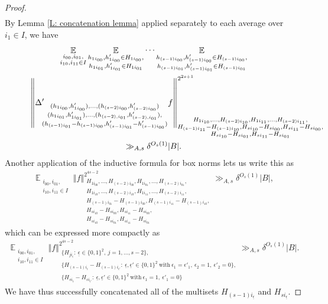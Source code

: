 \documentclass[11pt]{amsart}
\theoremstyle{definition}
\DeclareMathOperator*{\E}{\mathbb{E}}
\newcommand{\ueps}{{\underline{\epsilon}}}
\newcommand{\norm}[1]{\left\Vert #1\right\Vert}
\begin{document}
\begin{proof}
\begin{multline*}
\end{multline*}
By Lemma \ref{L: concatenation lemma} applied separately to each average over $i_1\in I$, we have
\begin{multline*}
    \E_{\substack{i_{00}, i_{01},\\ i_{10}, i_{11}\in I}} 
    \E_{\substack{h_{1i_{00}}, h_{1i_{00}}'\in H_{1i_{00}},\\ h_{1i_{01}}, h_{1i_{01}}'\in H_{1i_{01}}}}\cdots 
    \E_{\substack{h_{(s-1) i_{00}}, h_{(s-1) i_{00}}'\in H_{(s-1) i_{00}},\\ h_{(s-1) i_{01}}, h_{(s-1) i_{01}}'\in H_{(s-1) i_{01}}}}\\
    \norm{\Delta'_{\substack{(h_{1 i_{00}}, h_{1 i_{00}}'), \ldots, (h_{(s-2) i_{00}}, h_{(s-2) i_{00}}')\\ (h_{1 i_{01}}, h_{1 i_{01}}'), \ldots, (h_{(s-2), i_{01}}, h_{(s-2), i_{01}}'),\\ (h_{(s-1) i_{01}} - h_{(s-1) i_{00}}, h'_{(s-1) i_{01}} - h'_{(s-1) i_{00}}) }} f}_{\substack{H_{1 i_{10}}, \ldots, H_{(s-2) i_{10}}, H_{1 i_{11}}, \ldots, H_{(s-2) i_{11}},\\ H_{(s-1) i_{11}}-H_{(s-1) i_{10}}, H_{s i_{10}}-H_{s i_{00}}, H_{s i_{11}}-H_{s i_{00}},\\ H_{s i_{10}}-H_{s i_{01}}, H_{s i_{11}}-H_{s i_{01}}}}^{2^{2s+1}} \hspace{-20mm}\\ \gg_{A, s} \delta^{O_s(1)}|B|.
\end{multline*}
Another application of the inductive formula for box norms lets us write this as
\begin{align*}
    \E_{\substack{i_{00}, i_{01},\\ i_{10}, i_{11}\in I}} \norm{f}_{\substack{H_{1 i_{00}}, \ldots, H_{(s-2) i_{00}}, H_{1 i_{01}}, \ldots, H_{(s-2) i_{01}},\\ H_{1 i_{10}}, \ldots, H_{(s-2) i_{10}}, H_{1 i_{11}}, \ldots, H_{(s-2) i_{11}},\\ H_{(s-1) i_{01}}-H_{(s-1) i_{00}}, H_{(s-1) i_{11}}-H_{(s-1) i_{10}},\\ H_{s i_{10}}-H_{s i_{00}}, H_{s i_{11}}-H_{s i_{00}},\\ H_{s i_{10}}-H_{s i_{01}}, H_{s i_{11}}-H_{s i_{01}}}}^{2^{4s-2}}\gg_{A, s} \delta^{O_s(1)}|B|,
\end{align*}
which can be expressed more compactly as
\begin{align*}
    \E_{\substack{i_{00}, i_{01},\\ i_{10}, i_{11}\in I}} \norm{f}_{\substack{\{H_{j i_\ueps}:\ \ueps\in\{0,1\}^2,\ j=1, \ldots, s-2\},\\ \{H_{(s-1)i_\ueps}-H_{(s-1)i_{\ueps'}}:\ \ueps,\ueps'\in\{0,1\}^2\ \mathrm{with}\ \epsilon_1 = \epsilon'_1,\ \epsilon_2 = 1,\ \epsilon'_2=0\},\\  
    \{H_{s i_\ueps}-H_{s i_{\ueps'}}:\ \ueps,\ueps'\in\{0,1\}^2\ \mathrm{with}\ \epsilon_1 =1,\ \epsilon'_1 = 0\}}}^{2^{4s-2}}\gg_{A, s} \delta^{O_s(1)}|B|.
\end{align*}
We have thus successfully concatenated all of the multisets $H_{(s-1) i_\ueps}$ and $H_{s i_\ueps}$. 


\end{proof}
\end{document}
